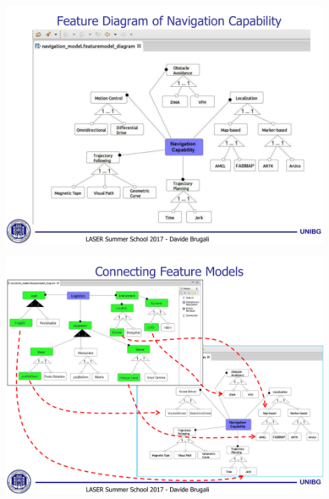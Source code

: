 \documentclass[xetex,mathserif,serif]{beamer}
\begin{document}
	\begin{frame}
		\begin{center}
			\includegraphics[width=0.9\textwidth]{brugali12.png}
		\end{center}
	\end{frame}

	\begin{frame}
		\begin{center}
			\includegraphics[width=0.9\textwidth]{brugali13.png}
		\end{center}
	\end{frame}
\end{document}
